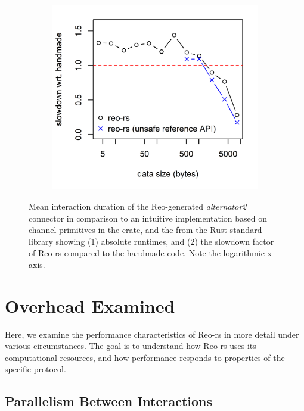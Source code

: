 \begin{figure}
{\begin{subfigure}[b]{0.63\textwidth}
			\includegraphics[width=\textwidth]{experiments/alternator_1.png}
			\caption{}
			\label{fig:alternator2_runtime_1}
		\end{subfigure}%
	}
	\caption[Hand-crafted vs.\ Reo-generated alternator.]{Mean interaction duration of the Reo-generated \textit{alternator2} connector in comparison to an intuitive implementation based on channel primitives in the  crate, and the  from the Rust standard library showing (1) absolute runtimes, and (2) the slowdown factor of Reo-rs compared to the handmade code. Note the logarithmic x-axis.}
	\label{fig:alternator}
	\label{fig:alternator2_runtime}
\end{figure}

\section{Overhead Examined}
Here, we examine the performance characteristics of Reo-rs in more detail under various circumstances. The goal is to understand how Reo-rs uses its computational resources, and how performance responds to properties of the specific protocol.

\subsection{Parallelism Between Interactions}

